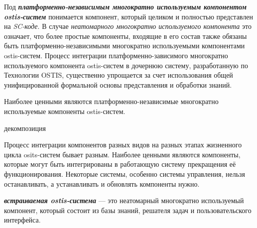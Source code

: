 Под \textbf{\textit{платформенно-независимым многократно используемым компонентом ostis-систем}} понимается компонент, который целиком и полностью представлен на \textit{SC-коде}. В случае \textit{неатомарного многократно используемого компонента} это означает, что  более простые компоненты, входящие в его состав также обязаны быть платформенно-независимыми многократно используемыми компонентами ostis-систем. Процесс интеграции платформенно-зависимого многократно используемого компонента ostis-систем в дочернюю систему, разработанную по Технологии OSTIS, существенно упрощается за счет использования общей унифицированной формальной основы представления и обработки знаний.

Наиболее ценными являются платформенно-независимые многократно используемые компоненты ostis-систем.

\begin{SCn}
\begin{scnindent}
	\begin{scneqtoset}
		\begin{scnindent}
			\begin{scnrelfromset}{декомпозиция}
			\end{scnrelfromset}
		\end{scnindent}
	\end{scneqtoset}
\end{scnindent}
\end{SCn}

Процесс интеграции компонентов разных видов на разных этапах жизненного цикла osits-систем бывает разным. Наиболее ценными являются компоненты, которые могут быть интегрированы в работающую систему  прекращения её функционирования. Некоторые системы, особенно системы управления, нельзя останавливать, а устанавливать и обновлять компоненты нужно.

\textbf{\textit{встраиваемая ostis-система}} --- это неатомарный многократно используемый компонент, который состоит из базы знаний, решателя задач и пользовательского интерфейса.

